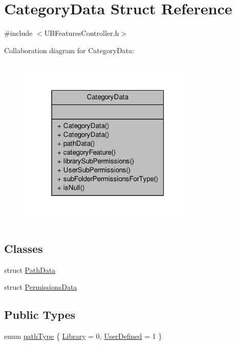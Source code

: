 \hypertarget{struct_category_data}{\section{Category\-Data Struct Reference}
\label{d2/d9e/struct_category_data}
}


{\ttfamily \#include $<$U\-B\-Features\-Controller.\-h$>$}



Collaboration diagram for Category\-Data\-:
\nopagebreak
\begin{figure}[H]
\begin{center}
\leavevmode
\includegraphics[width=244pt]{dc/d97/struct_category_data__coll__graph}
\end{center}
\end{figure}
\subsection*{Classes}
\begin{DoxyCompactItemize}
\item 
struct \hyperlink{struct_category_data_1_1_path_data}{Path\-Data}
\item 
struct \hyperlink{struct_category_data_1_1_permissions_data}{Permissions\-Data}
\end{DoxyCompactItemize}
\subsection*{Public Types}
\begin{DoxyCompactItemize}
\item 
enum \hyperlink{struct_category_data_a69249ca5f66736ffb9fb8136d012030a}{path\-Type} \{ \hyperlink{struct_category_data_a69249ca5f66736ffb9fb8136d012030aacf2d83eb1af825781eb7b471bf6e25b8}{Library} =  0, 
\hyperlink{struct_category_data_a69249ca5f66736ffb9fb8136d012030aa3c42bc32e8dbf7ba16b44aac0d126478}{User\-Defined} =  1
 \}
\end{DoxyCompactItemize}
